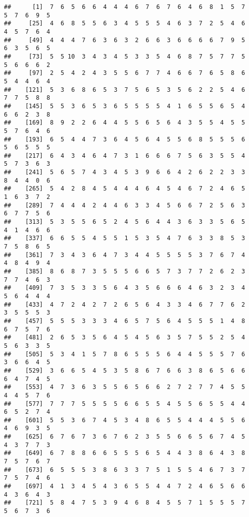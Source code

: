 \documentclass[
]{book}
\begin{document}
\begin{verbatim}
##      [1]  7  6  5  6  6  4  4  4  6  7  6  7  6  4  6  8  1  5  7  5  7  6  9  5
##     [25]  4  6  8  5  5  6  3  4  5  5  5  4  6  3  7  2  5  4  6  4  5  7  6  4
##     [49]  4  4  4  7  6  3  6  3  2  6  6  3  6  6  6  6  7  9  5  6  3  5  6  5
##     [73]  5  5 10  3  4  3  4  5  3  3  5  4  6  8  7  5  7  7  5  5  6  6  6  2
##     [97]  2  5  4  2  4  3  5  5  6  7  7  4  6  6  7  6  5  8  6  5  4  4  6  4
##    [121]  5  3  6  8  6  5  3  7  5  6  5  3  5  6  2  2  5  4  6  7  7  5  8  8
##    [145]  5  5  3  6  5  3  6  5  5  5  5  4  1  6  5  5  6  5  4  6  6  2  3  8
##    [169]  8  9  2  2  6  4  4  5  5  6  5  6  4  3  5  5  4  5  5  5  7  6  4  6
##    [193]  6  5  4  4  7  3  6  4  5  6  4  5  5  6  8  5  5  5  6  5  6  5  5  5
##    [217]  6  4  3  4  6  4  7  3  1  6  6  6  7  5  6  3  5  5  4  5  7  3  6  3
##    [241]  5  6  5  7  4  3  4  5  3  9  6  6  4  2  6  2  2  3  3  8  4  4  0  6
##    [265]  5  4  2  8  4  5  4  4  4  6  4  5  4  6  7  2  4  6  5  1  6  3  7  2
##    [289]  7  4  4  4  2  4  4  6  3  3  4  5  6  6  7  2  5  6  3  6  7  7  5  6
##    [313]  5  3  5  5  6  5  2  4  5  6  4  4  3  6  3  3  5  6  5  4  1  4  6  6
##    [337]  6  6  5  5  4  5  5  1  5  3  5  4  7  6  3  3  8  5  3  7  5  8  6  5
##    [361]  7  3  4  3  6  4  7  3  4  4  5  5  5  5  3  7  6  7  4  4  8  4  9  4
##    [385]  8  6  8  7  3  5  5  5  6  6  5  7  3  7  7  2  6  2  3  7  7  4  6  3
##    [409]  7  3  5  3  3  5  6  4  3  5  6  6  6  4  6  3  2  3  4  5  6  4  4  4
##    [433]  4  7  2  4  2  7  2  6  5  6  4  3  3  4  6  7  7  6  2  3  5  5  5  3
##    [457]  5  5  5  3  3  3  4  6  5  7  5  6  4  5  5  5  1  4  8  6  7  5  7  6
##    [481]  2  6  5  3  5  6  4  5  4  5  6  3  5  7  5  5  2  5  4  5  6  3  3  5
##    [505]  5  3  4  1  5  7  8  6  5  5  5  6  4  4  5  5  5  7  6  3  6  6  4  5
##    [529]  3  6  6  5  4  5  3  5  8  6  7  6  6  3  8  6  5  6  6  6  4  7  4  5
##    [553]  4  7  3  6  3  5  5  6  5  6  6  2  7  2  7  7  4  5  5  4  4  5  7  6
##    [577]  7  7  7  5  5  5  5  6  6  5  5  4  5  5  6  5  5  4  4  6  5  2  7  4
##    [601]  5  5  3  6  7  4  5  3  4  8  6  5  5  4  4  4  5  5  6  4  6  9  3  5
##    [625]  6  7  6  7  3  6  7  6  2  3  5  5  6  6  5  6  7  4  5  4  3  7  7  3
##    [649]  6  7  8  8  6  6  5  5  5  6  5  4  4  3  8  6  4  3  8  7  5  7  6  7
##    [673]  6  5  5  5  3  8  6  3  3  7  5  1  5  5  4  6  7  3  7  7  5  7  4  6
##    [697]  4  1  3  4  5  4  3  6  5  5  4  4  7  2  4  6  5  6  6  4  3  6  4  3
##    [721]  5  8  4  7  5  3  9  4  6  8  4  5  5  7  1  5  5  5  7  5  6  7  3  6

\end{verbatim}
\end{document}
